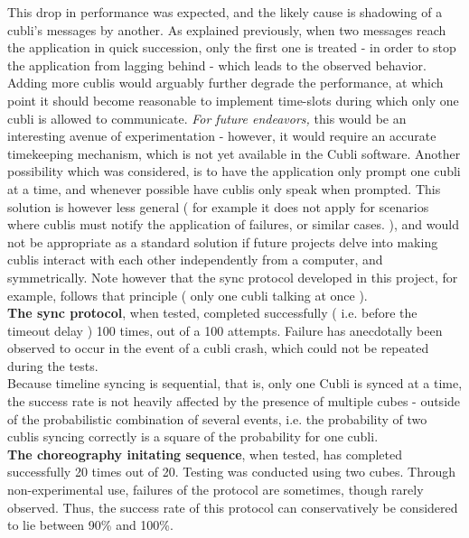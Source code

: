 This drop in performance was expected, and the likely cause is shadowing of a cubli's messages by another. As explained previously, when two messages reach the application in quick succession, only the first one is treated - in order to stop the application from lagging behind - which leads to the observed behavior. \\

Adding more cublis would arguably further degrade the performance, at which point it should become reasonable to implement time-slots during which only one cubli is allowed to communicate. \textit{ For future endeavors, } this would be an interesting avenue of experimentation - however, it would require an accurate timekeeping mechanism, which is not yet available in the Cubli software. Another possibility which was considered, is to have the application only prompt one cubli at a time, and whenever possible have cublis only speak when prompted. This solution is however less general ( for example it does not apply for scenarios where cublis must notify the application of failures, or similar cases. ), and would not be appropriate as a standard solution if future projects delve into making cublis interact with each other independently from a computer, and symmetrically. Note however that the sync protocol developed in this project, for example, follows that principle ( only one cubli talking at once ). \\

\textbf{The sync protocol}, when tested, completed successfully ( i.e. before the timeout delay ) 100 times, out of a 100 attempts. Failure has anecdotally been observed to occur in the event of a cubli crash, which could not be repeated during the tests.\\

Because timeline syncing is sequential, that is, only one Cubli is synced at a time, the success rate is not heavily affected by the presence of multiple cubes - outside of the probabilistic combination of several events, i.e. the probability of two cublis syncing correctly is a square of the probability for one cubli.\\

\textbf{The choreography initating sequence}, when tested, has completed successfully 20 times out of 20. Testing was conducted using two cubes. Through non-experimental use, failures of the protocol are sometimes, though rarely observed. Thus, the success rate of this protocol can conservatively be considered to lie between 90\% and 100\%. \\

